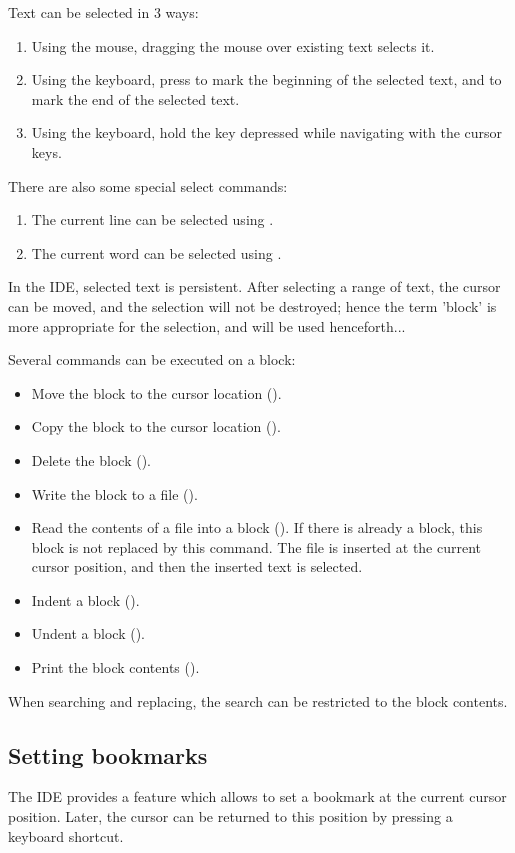 Text can be selected in 3 ways:
\begin{enumerate}
\item Using the mouse, dragging the mouse over existing text selects it.
\item Using the keyboard, press  to mark the beginning of
the selected text, and  to mark the end of the selected
text.
\item Using the keyboard, hold the  key depressed while
navigating with the cursor keys.
\end{enumerate}

There are also some special select commands:
\begin{enumerate}
\item The current line can be selected using .
\item The current word can be selected using .
\end{enumerate}

In the \fpc IDE, selected text is persistent. After selecting a range of 
text, the cursor can be moved, and the selection will not be destroyed;
hence the term 'block' is more appropriate for the selection, and will be
used henceforth...

Several commands can be executed on a block:
\begin{itemize}
\item Move the block to the cursor location ().
\item Copy the block to the cursor location ().
\item Delete the block ().
\item Write the block to a file ().
\item Read the contents of a file into a block ().
If there is already a block, this block is not replaced by this command.
The file is inserted at the current cursor position, and then the
inserted text is selected.
\item Indent a block ().
\item Undent a block ().
\item Print the block contents ().
\end{itemize}
When searching and replacing, the search can be restricted to the block 
contents.

%
%
\subsection{Setting bookmarks}
\label{se:bookmarks}
The IDE provides a feature which allows to set a bookmark at the current 
cursor position. Later, the cursor can be returned to this position 
by pressing a keyboard shortcut.

